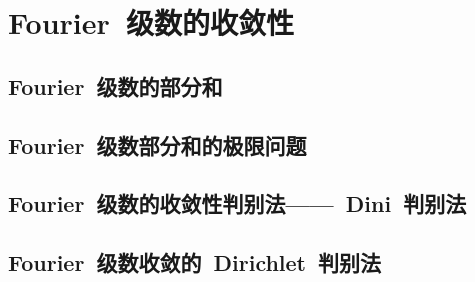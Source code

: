 \section{Fourier~级数的收敛性}
\subsection{Fourier~级数的部分和}
\subsection{Fourier~级数部分和的极限问题}
\subsection{Fourier~级数的收敛性判别法——~Dini~判别法}
\subsection{Fourier~级数收敛的~Dirichlet~判别法}
